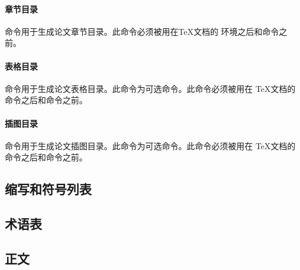 \paragraph{章节目录}

命令用于生成论文章节目录。此命令必须被用在{\TeX}文档的
环境之后和命令之前。
\begin{tex}
\tableofcontents
\end{tex}

\paragraph{表格目录}

命令用于生成论文表格目录。此命令为可选命令。此命令必须被用在
{\TeX}文档的命令之后和命令之前。
\begin{tex}
\listoftables
\end{tex}

\paragraph{插图目录}

命令用于生成论文插图目录。此命令为可选命令。此命令必须被用在
{\TeX}文档的命令之后和命令之前。
\begin{tex}
\listoffigures
\end{tex}


\subsection{缩写和符号列表}


\subsection{术语表}


\subsection{正文}

